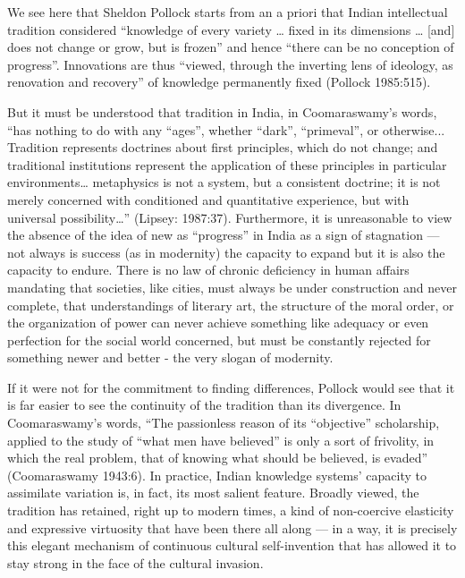 We see here that Sheldon Pollock starts from an a priori that Indian intellectual tradition considered “knowledge of every variety … fixed in its dimensions … [and] does not change or grow, but is frozen” and hence “there can be no conception of progress”. Innovations are thus “viewed, through the inverting lens of ideology, as renovation and recovery” of knowledge permanently fixed (Pollock 1985:515).  

But it must be understood that tradition in India, in Coomaraswamy’s words, “has nothing to do with any “ages”, whether “dark”, “primeval”, or otherwise... Tradition represents doctrines about first principles, which do not change; and traditional institutions represent the application of these principles in particular environments… metaphysics is not a system, but a consistent doctrine; it is not merely concerned with conditioned and quantitative experience, but with universal possibility…” (Lipsey: 1987:37). Furthermore, it is unreasonable to view the absence of the idea of new as “progress” in India as a sign of stagnation — not always is success (as in modernity) the capacity to expand but it is also the capacity to endure. There is no law of chronic deficiency in human affairs mandating that societies, like cities, must always be under construction and never complete, that understandings of literary art, the structure of the moral order, or the organization of power can never achieve something like adequacy or even perfection for the social world concerned, but must be constantly rejected for something newer and better - the very slogan of modernity.  
\begin{myquote}
If it were not for the commitment to finding differences, Pollock would see that it is far easier to see the continuity of the tradition than its divergence. In Coomaraswamy’s words, “The passionless reason of its “objective” scholarship, applied to the study of “what men have believed” is only a sort of frivolity, in which the real problem, that of knowing what should be believed, is evaded” (Coomaraswamy 1943:6). In practice, Indian knowledge systems’ capacity to assimilate variation is, in fact, its most salient feature. Broadly viewed, the tradition has retained, right up to modern times, a kind of non-coercive elasticity and expressive virtuosity that have been there all along — in a way, it is precisely this elegant mechanism of continuous cultural self-invention that has allowed it to stay strong in the face of the cultural invasion. 
\end{myquote}

